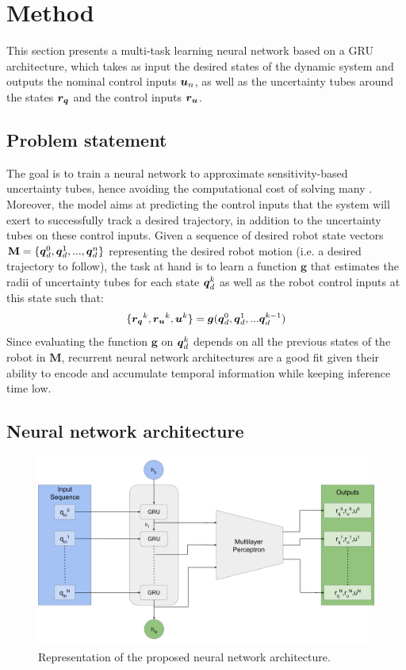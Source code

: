 \section{Method} \label{sec:method}

This section presents a multi-task learning neural network based on a GRU architecture, which takes as input the desired states of the dynamic system and outputs the nominal control inputs $\boldsymbol{u}_n$, as well as the uncertainty tubes around the states $\boldsymbol{r_q}$ and the control inputs $\boldsymbol{r_u}$. 

\subsection{Problem statement}

The goal is to train a neural network to approximate sensitivity-based uncertainty tubes, hence avoiding the computational cost of solving many . 
Moreover, the model aims at predicting the control inputs that the system will exert to successfully track a desired trajectory, in addition to the uncertainty tubes on these control inputs. 
Given a sequence of desired robot state vectors $\textbf{M} = \{\boldsymbol{q}_{d}^0, \boldsymbol{q}_{d}^1, ..., \boldsymbol{q}_{d}^n\}$ representing the desired robot motion (i.e. a desired trajectory to follow), the task at hand is to learn a function $\boldsymbol{g}$ that estimates the radii of uncertainty tubes for each state $\boldsymbol{q}_{d}^k$ as well as the robot control inputs at this state such that:
\begin{equation}\label{eq:prob_statement}
\{\boldsymbol{r_q}^{k}, \boldsymbol{r_u}^{k},\boldsymbol{u}^{k}\} = \boldsymbol{g}(\boldsymbol{q}_{d}^0, \boldsymbol{q}_{d}^1, ... \boldsymbol{q}_{d}^{k-1})
\end{equation}
Since evaluating the function $\boldsymbol{g}$ on $\boldsymbol{q}_{d}^k$ depends on all the previous states of the robot in $\textbf{M}$, recurrent neural network architectures are a good fit given their ability to encode and accumulate temporal information while keeping inference time low.

\subsection{Neural network architecture}\label{sec:architecture}

\begin{figure} [t]
    \centering
    \includegraphics[width=0.8\linewidth]{figures/learning_quadrotor/SensiNN_GRU.png}%
    \caption{Representation of the proposed neural network architecture.
    }%
    \label{fig: NN}%
\end{figure}

